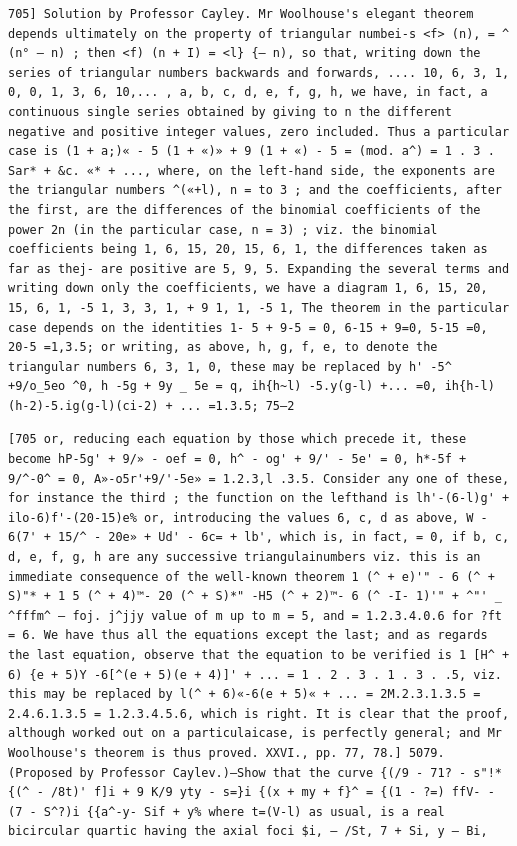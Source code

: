 \documentclass[11pt,a4paper]{book}
\begin{document}
\newpage
\setcounter{page}{595}
\begin{verbatim}
705] Solution by Professor Cayley. Mr Woolhouse's elegant theorem depends ultimately on the property of triangular numbei-s <f> (n), = ^ (n° — n) ; then <f) (n + I) = <l} {— n), so that, writing down the series of triangular numbers backwards and forwards, .... 10, 6, 3, 1, 0, 0, 1, 3, 6, 10,... , a, b, c, d, e, f, g, h, we have, in fact, a continuous single series obtained by giving to n the different negative and positive integer values, zero included. Thus a particular case is (1 + a;)« - 5 (1 + «)» + 9 (1 + «) - 5 = (mod. a^) = 1 . 3 . Sar* + &c. «* + ..., where, on the left-hand side, the exponents are the triangular numbers ^(«+l), n = to 3 ; and the coefficients, after the first, are the differences of the binomial coefficients of the power 2n (in the particular case, n = 3) ; viz. the binomial coefficients being 1, 6, 15, 20, 15, 6, 1, the differences taken as far as thej- are positive are 5, 9, 5. Expanding the several terms and writing down only the coefficients, we have a diagram 1, 6, 15, 20, 15, 6, 1, -5 1, 3, 3, 1, + 9 1, 1, -5 1, The theorem in the particular case depends on the identities 1- 5 + 9-5 = 0, 6-15 + 9=0, 5-15 =0, 20-5 =1,3.5; or writing, as above, h, g, f, e, to denote the triangular numbers 6, 3, 1, 0, these may be replaced by h' -5^ +9/o_5eo ^0, h -5g + 9y _ 5e = q, ih{h~l) -5.y(g-l) +... =0, ih{h-l)(h-2)-5.ig(g-l)(ci-2) + ... =1.3.5; 75—2 
\end{verbatim}

\newpage
\setcounter{page}{596}
\begin{verbatim}
[705 or, reducing each equation by those which precede it, these become hP-5g' + 9/» - oef = 0, h^ - og' + 9/' - 5e' = 0, h*-5f + 9/^-0^ = 0, A»-o5r'+9/'-5e» = 1.2.3,l .3.5. Consider any one of these, for instance the third ; the function on the lefthand is lh'-(6-l)g' + ilo-6)f'-(20-15)e% or, introducing the values 6, c, d as above, W - 6(7' + 15/^ - 20e» + Ud' - 6c= + lb', which is, in fact, = 0, if b, c, d, e, f, g, h are any successive triangulainumbers viz. this is an immediate consequence of the well-known theorem 1 (^ + e)'" - 6 (^ + S)"* + 1 5 (^ + 4)™- 20 (^ + S)*" -H5 (^ + 2)™- 6 (^ -I- 1)'" + ^"' _ ^fffm^ — foj. j^jjy value of m up to m = 5, and = 1.2.3.4.0.6 for ?ft = 6. We have thus all the equations except the last; and as regards the last equation, observe that the equation to be verified is 1 [H^ + 6) {e + 5)Y -6[^(e + 5)(e + 4)]' + ... = 1 . 2 . 3 . 1 . 3 . .5, viz. this may be replaced by l(^ + 6)«-6(e + 5)« + ... = 2M.2.3.1.3.5 = 2.4.6.1.3.5 = 1.2.3.4.5.6, which is right. It is clear that the proof, although worked out on a particulaicase, is perfectly general; and Mr Woolhouse's theorem is thus proved. XXVI., pp. 77, 78.] 5079. (Proposed by Professor Caylev.)—Show that the curve {(/9 - 71? - s"!* {(^ - /8t)' f]i + 9 K/9 yty - s=}i {(x + my + f}^ = {(1 - ?=) ffV- - (7 - S^?)i {{a^-y- Sif + y% where t=(V-l) as usual, is a real bicircular quartic having the axial foci $i, — /St, 7 + Si, y — Bi, 
\end{verbatim}
\end{document}
